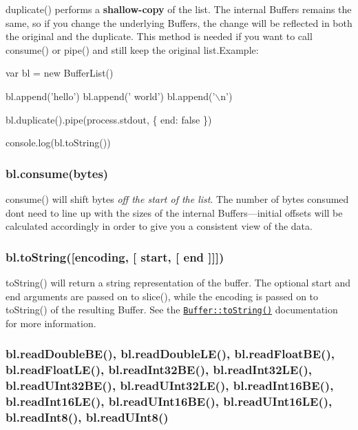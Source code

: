 {\ttfamily duplicate()} performs a {\bfseries shallow-\/copy} of the list. The internal Buffers remains the same, so if you change the underlying Buffers, the change will be reflected in both the original and the duplicate. This method is needed if you want to call {\ttfamily consume()} or {\ttfamily pipe()} and still keep the original list.\+Example\+:


\begin{DoxyCode}
var bl = new BufferList()

bl.append('hello')
bl.append(' world')
bl.append('\(\backslash\)n')

bl.duplicate().pipe(process.stdout, \{ end: false \})

console.log(bl.toString())
\end{DoxyCode}
 

 \label{_consume}%
 \subsubsection*{bl.\+consume(bytes)}

{\ttfamily consume()} will shift bytes {\itshape off the start of the list}. The number of bytes consumed don\textquotesingle{}t need to line up with the sizes of the internal Buffers---initial offsets will be calculated accordingly in order to give you a consistent view of the data. 

 \label{_toString}%
 \subsubsection*{bl.\+to\+String(\mbox{[}encoding, \mbox{[} start, \mbox{[} end \mbox{]}\mbox{]}\mbox{]})}

{\ttfamily to\+String()} will return a string representation of the buffer. The optional {\ttfamily start} and {\ttfamily end} arguments are passed on to {\ttfamily slice()}, while the {\ttfamily encoding} is passed on to {\ttfamily to\+String()} of the resulting Buffer. See the \href{http://nodejs.org/docs/latest/api/buffer.html#buffer_buf_tostring_encoding_start_end}{\tt Buffer\+::to\+String()} documentation for more information. 

 \label{_readXX}%
 \subsubsection*{bl.\+read\+Double\+B\+E(), bl.\+read\+Double\+L\+E(), bl.\+read\+Float\+B\+E(), bl.\+read\+Float\+L\+E(), bl.\+read\+Int32\+B\+E(), bl.\+read\+Int32\+L\+E(), bl.\+read\+U\+Int32\+B\+E(), bl.\+read\+U\+Int32\+L\+E(), bl.\+read\+Int16\+B\+E(), bl.\+read\+Int16\+L\+E(), bl.\+read\+U\+Int16\+B\+E(), bl.\+read\+U\+Int16\+L\+E(), bl.\+read\+Int8(), bl.\+read\+U\+Int8()}

